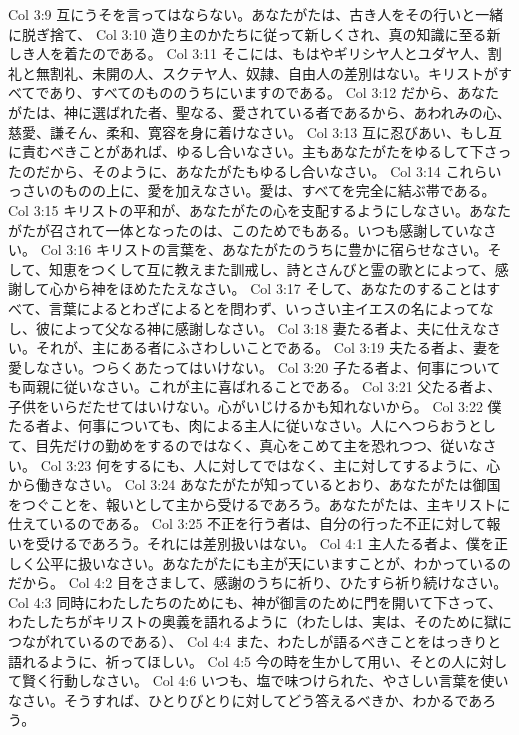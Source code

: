 Col 3:9  互にうそを言ってはならない。あなたがたは、古き人をその行いと一緒に脱ぎ捨て、
Col 3:10  造り主のかたちに従って新しくされ、真の知識に至る新しき人を着たのである。
Col 3:11  そこには、もはやギリシヤ人とユダヤ人、割礼と無割礼、未開の人、スクテヤ人、奴隷、自由人の差別はない。キリストがすべてであり、すべてのもののうちにいますのである。
Col 3:12  だから、あなたがたは、神に選ばれた者、聖なる、愛されている者であるから、あわれみの心、慈愛、謙そん、柔和、寛容を身に着けなさい。
Col 3:13  互に忍びあい、もし互に責むべきことがあれば、ゆるし合いなさい。主もあなたがたをゆるして下さったのだから、そのように、あなたがたもゆるし合いなさい。
Col 3:14  これらいっさいのものの上に、愛を加えなさい。愛は、すべてを完全に結ぶ帯である。
Col 3:15  キリストの平和が、あなたがたの心を支配するようにしなさい。あなたがたが召されて一体となったのは、このためでもある。いつも感謝していなさい。
Col 3:16  キリストの言葉を、あなたがたのうちに豊かに宿らせなさい。そして、知恵をつくして互に教えまた訓戒し、詩とさんびと霊の歌とによって、感謝して心から神をほめたたえなさい。
Col 3:17  そして、あなたのすることはすべて、言葉によるとわざによるとを問わず、いっさい主イエスの名によってなし、彼によって父なる神に感謝しなさい。
Col 3:18  妻たる者よ、夫に仕えなさい。それが、主にある者にふさわしいことである。
Col 3:19  夫たる者よ、妻を愛しなさい。つらくあたってはいけない。
Col 3:20  子たる者よ、何事についても両親に従いなさい。これが主に喜ばれることである。
Col 3:21  父たる者よ、子供をいらだたせてはいけない。心がいじけるかも知れないから。
Col 3:22  僕たる者よ、何事についても、肉による主人に従いなさい。人にへつらおうとして、目先だけの勤めをするのではなく、真心をこめて主を恐れつつ、従いなさい。
Col 3:23  何をするにも、人に対してではなく、主に対してするように、心から働きなさい。
Col 3:24  あなたがたが知っているとおり、あなたがたは御国をつぐことを、報いとして主から受けるであろう。あなたがたは、主キリストに仕えているのである。
Col 3:25  不正を行う者は、自分の行った不正に対して報いを受けるであろう。それには差別扱いはない。
Col 4:1  主人たる者よ、僕を正しく公平に扱いなさい。あなたがたにも主が天にいますことが、わかっているのだから。
Col 4:2  目をさまして、感謝のうちに祈り、ひたすら祈り続けなさい。
Col 4:3  同時にわたしたちのためにも、神が御言のために門を開いて下さって、わたしたちがキリストの奥義を語れるように（わたしは、実は、そのために獄につながれているのである）、
Col 4:4  また、わたしが語るべきことをはっきりと語れるように、祈ってほしい。
Col 4:5  今の時を生かして用い、そとの人に対して賢く行動しなさい。
Col 4:6  いつも、塩で味つけられた、やさしい言葉を使いなさい。そうすれば、ひとりびとりに対してどう答えるべきか、わかるであろう。

